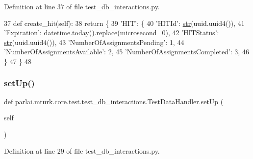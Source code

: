 Definition at line 37 of file test\+\_\+db\+\_\+interactions.\+py.


\begin{DoxyCode}
37     \textcolor{keyword}{def }create\_hit(self):
38         \textcolor{keywordflow}{return} \{
39             \textcolor{stringliteral}{'HIT'}: \{
40                 \textcolor{stringliteral}{'HITId'}: \hyperlink{namespacegenerate__task__READMEs_a5b88452ffb87b78c8c85ececebafc09f}{str}(uuid.uuid4()),
41                 \textcolor{stringliteral}{'Expiration'}: datetime.today().replace(microsecond=0),
42                 \textcolor{stringliteral}{'HITStatus'}: \hyperlink{namespacegenerate__task__READMEs_a5b88452ffb87b78c8c85ececebafc09f}{str}(uuid.uuid4()),
43                 \textcolor{stringliteral}{'NumberOfAssignmentsPending'}: 1,
44                 \textcolor{stringliteral}{'NumberOfAssignmentsAvailable'}: 2,
45                 \textcolor{stringliteral}{'NumberOfAssignmentsCompleted'}: 3,
46             \}
47         \}
48 
\end{DoxyCode}
\mbox{\label{classparlai_1_1mturk_1_1core_1_1test_1_1test__db__interactions_1_1TestDataHandler_a9c1badb44d84077d1a5700aa0c51fdb8}} 
\subsubsection{\texorpdfstring{set\+Up()}{setUp()}}
{\footnotesize\ttfamily def parlai.\+mturk.\+core.\+test.\+test\+\_\+db\+\_\+interactions.\+Test\+Data\+Handler.\+set\+Up (\begin{DoxyParamCaption}\item[{}]{self }\end{DoxyParamCaption})}



Definition at line 29 of file test\+\_\+db\+\_\+interactions.\+py.


